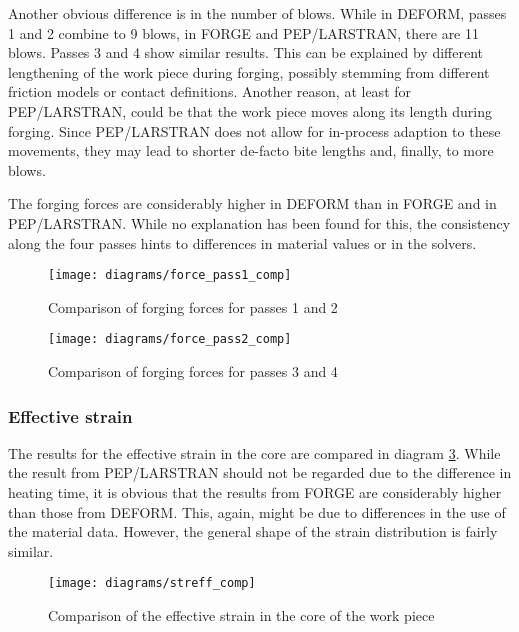 Another obvious difference is in the number of blows. While in DEFORM, passes 1 and 2 combine to 9 blows, in FORGE and PEP/LARSTRAN, there are 11 blows. Passes 3 and 4 show similar results. This can be explained by different lengthening of the work piece during forging, possibly stemming from different friction models or contact definitions. Another reason, at least for PEP/LARSTRAN, could be that the work piece moves along its length during forging. Since PEP/LARSTRAN does not allow for in-process adaption to these movements, they may lead to shorter de-facto bite lengths and, finally, to more blows.

The forging forces are considerably higher in DEFORM than in FORGE and in PEP/LARSTRAN. While no explanation has been found for this, the consistency along the four passes hints to differences in material values or in the solvers.

\begin{figure}[tb]
  \centering
  \texttt{[image: diagrams/force\_pass1\_comp]}
  \caption{Comparison of forging forces for passes 1 and 2}
  \label{img:forgforce_comp_p1}
\end{figure}

\begin{figure}[tb]
  \centering
  \texttt{[image: diagrams/force\_pass2\_comp]}
  \caption{Comparison of forging forces for passes 3 and 4}
  \label{img:forgforce_comp_p2}
\end{figure}


\subsubsection{Effective strain}

The results for the effective strain in the core are compared in diagram \ref{img:streff_comp}. While the result from PEP/LARSTRAN should not be regarded due to the difference in heating time, it is obvious that the results from FORGE are considerably higher than those from DEFORM. This, again, might be due to differences in the use of the material data. However, the general shape of the strain distribution is fairly similar.

\begin{figure}[tb]
  \centering
  \texttt{[image: diagrams/streff\_comp]}
  \caption{Comparison of the effective strain in the core of the work piece}
  \label{img:streff_comp}
\end{figure}


